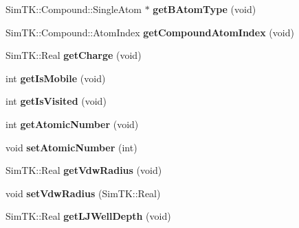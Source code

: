 \begin{DoxyCompactItemize}
\item 
Sim\+T\+K\+::\+Compound\+::\+Single\+Atom $\ast$ {\bfseries get\+B\+Atom\+Type} (void)\hypertarget{classbSpecificAtom_acfad2017397b410848b8c20995ea37fd}{}\label{classbSpecificAtom_acfad2017397b410848b8c20995ea37fd}

\item 
Sim\+T\+K\+::\+Compound\+::\+Atom\+Index {\bfseries get\+Compound\+Atom\+Index} (void)\hypertarget{classbSpecificAtom_a477ccb6df0ebe46e3319fa4fac7f1d4e}{}\label{classbSpecificAtom_a477ccb6df0ebe46e3319fa4fac7f1d4e}

\item 
Sim\+T\+K\+::\+Real {\bfseries get\+Charge} (void)\hypertarget{classbSpecificAtom_a7e65dcb835b44517975b2876e9d90ef2}{}\label{classbSpecificAtom_a7e65dcb835b44517975b2876e9d90ef2}

\item 
int {\bfseries get\+Is\+Mobile} (void)\hypertarget{classbSpecificAtom_ac6ff45262841e7e214f87e033229c37a}{}\label{classbSpecificAtom_ac6ff45262841e7e214f87e033229c37a}

\item 
int {\bfseries get\+Is\+Visited} (void)\hypertarget{classbSpecificAtom_a86ddaa427f46c58b21549a564bad9659}{}\label{classbSpecificAtom_a86ddaa427f46c58b21549a564bad9659}

\item 
int {\bfseries get\+Atomic\+Number} (void)\hypertarget{classbSpecificAtom_a23637eeade0f68bc6d62e46067f370c7}{}\label{classbSpecificAtom_a23637eeade0f68bc6d62e46067f370c7}

\item 
void {\bfseries set\+Atomic\+Number} (int)\hypertarget{classbSpecificAtom_ae3471a1d3e5cb1e68985ad3ac93b7e49}{}\label{classbSpecificAtom_ae3471a1d3e5cb1e68985ad3ac93b7e49}

\item 
Sim\+T\+K\+::\+Real {\bfseries get\+Vdw\+Radius} (void)\hypertarget{classbSpecificAtom_adf3bfcc2952942dd744bafbfc489de5a}{}\label{classbSpecificAtom_adf3bfcc2952942dd744bafbfc489de5a}

\item 
void {\bfseries set\+Vdw\+Radius} (Sim\+T\+K\+::\+Real)\hypertarget{classbSpecificAtom_afbc87436f68f5fe693e90917c71ce0ff}{}\label{classbSpecificAtom_afbc87436f68f5fe693e90917c71ce0ff}

\item 
Sim\+T\+K\+::\+Real {\bfseries get\+L\+J\+Well\+Depth} (void)\hypertarget{classbSpecificAtom_adb0565d0cafc1cf5173257ef53a92475}{}\label{classbSpecificAtom_adb0565d0cafc1cf5173257ef53a92475}


\end{DoxyCompactItemize}
